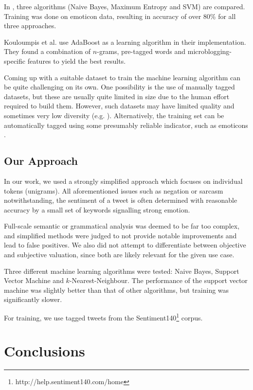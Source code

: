 \documentclass{sig-alternate}
\begin{document}
In \cite{go2009twitter}, three algorithms (Naive Bayes, Maximum Entropy and SVM) are compared. Training was done on emoticon data, resulting in accuracy of over 80\% for all three approaches.

Kouloumpis et al. \cite{kouloumpis2011twitter} use AdaBoost as a learning algorithm in their implementation. They found a combination of $n$-grams, pre-tagged words and microblogging-specific features to yield the best results.



Coming up with a suitable dataset to train the machine learning algorithm can be quite challenging on its own. One possibility is the use of manually tagged datasets, but these are usually quite limited in size due to the human effort required to build them. However, such datasets may have limited quality and sometimes very low diversity (e.g. \cite{barbosa2010robust}). Alternatively, the training set can be automatically tagged using some presumably reliable indicator, such as emoticons \cite{go2009twitter}.


\subsection{Our Approach}

In our work, we used a strongly simplified approach which focuses on individual tokens (unigrams). All aforementioned issues such as negation or sarcasm notwithstanding, the sentiment of a tweet is often determined with reasonable accuracy by a small set of keywords signalling strong emotion.

Full-scale semantic or grammatical analysis was deemed to be far too complex, and simplified methods were judged to not provide notable improvements and lead to false positives. We also did not attempt to differentiate between objective and subjective valuation, since both are likely relevant for the given use case.

Three different machine learning algorithms were tested: Naive Bayes, Support Vector Machine and $k$-Nearest-Neighbour. The performance of the support vector machine was slightly better than that of other algorithms, but training was significantly slower.

For training, we use tagged tweets from the Sentiment140\footnote{http://help.sentiment140.com/home} corpus.

\section{Conclusions}
\end{document}
